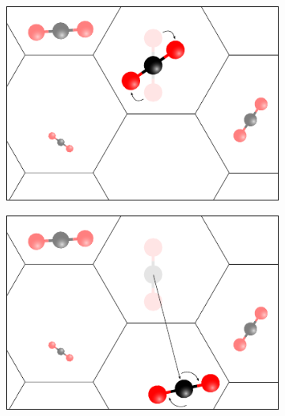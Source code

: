 \documentclass[main.tex]{subfiles}
\begin{document}
\begin{figure}
	\begin{subfigure}{0.49\linewidth}
		\centering
		\includegraphics[width=\linewidth]{figures/cations/MC_rotation.pdf}
	\end{subfigure}\hfill%
	\begin{subfigure}{0.49\linewidth}
		\centering
		\includegraphics[width=\linewidth]{figures/cations/MC_reinsertion.pdf}
	\end{subfigure}

\vspace{2em}


\end{figure}
\end{document}
